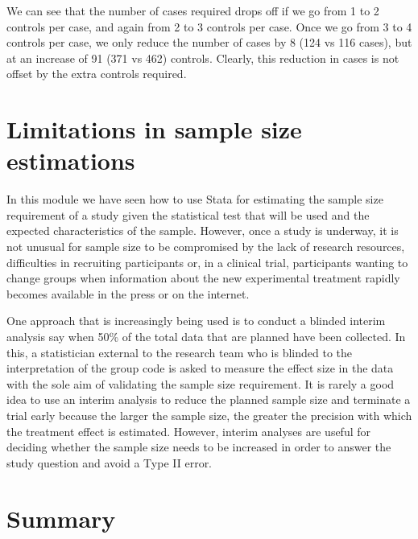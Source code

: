 \documentclass[
]{memoir}
\begin{document}
We can see that the number of cases required drops off if we go from 1 to 2 controls per case, and again from 2 to 3 controls per case. Once we go from 3 to 4 controls per case, we only reduce the number of cases by 8 (124 vs 116 cases), but at an increase of 91 (371 vs 462) controls. Clearly, this reduction in cases is not offset by the extra controls required.

\hypertarget{limitations-in-sample-size-estimations}{%
\section{Limitations in sample size estimations}\label{limitations-in-sample-size-estimations}}

In this module we have seen how to use Stata for estimating the sample size requirement of a study given the statistical test that will be used and the expected characteristics of the sample. However, once a study is underway, it is not unusual for sample size to be compromised by the lack of research resources, difficulties in recruiting participants or, in a clinical trial, participants wanting to change groups when information about the new experimental treatment rapidly becomes available in the press or on the internet.

One approach that is increasingly being used is to conduct a blinded interim analysis say when 50\% of the total data that are planned have been collected. In this, a statistician external to the research team who is blinded to the interpretation of the group code is asked to measure the effect size in the data with the sole aim of validating the sample size requirement. It is rarely a good idea to use an interim analysis to reduce the planned sample size and terminate a trial early because the larger the sample size, the greater the precision with which the treatment effect is estimated. However, interim analyses are useful for deciding whether the sample size needs to be increased in order to answer the study question and avoid a Type II error.

\hypertarget{summary-2}{%
\section{Summary}\label{summary-2}}
\end{document}
